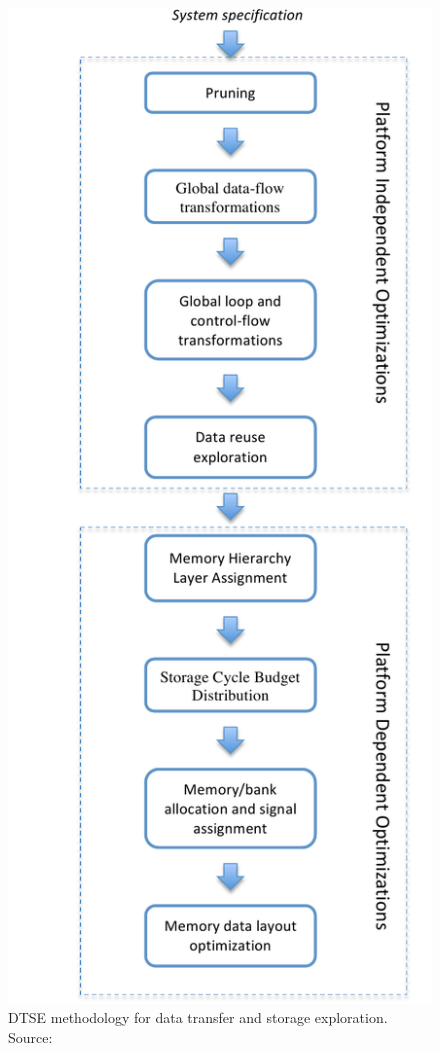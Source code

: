 \begin{figure}
	\centering
	\includegraphics[scale=0.7]{Images/dtse3.pdf}
	\caption{DTSE methodology for data transfer and storage exploration. Source: \cite{palkovicThesis} }
	\label{fig:dtse}
\end{figure}

